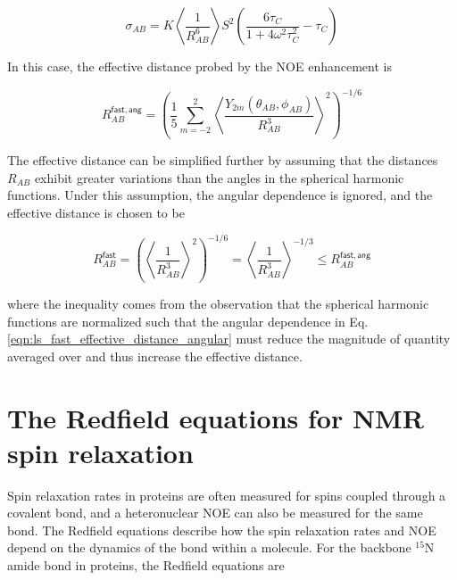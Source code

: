 \documentclass[9pt,review]{livecoms}
\begin{document}
\begin{equation}
\label{eqn:ls_fast_cross_relaxation}
\sigma_{AB} = K \left \langle \frac {1} {R_{AB}^6} \right \rangle S^2 \left( \frac {6 \tau_C} {1 + 4 \omega^2 \tau_C^2} - \tau_C \right)
\end{equation}

\noindent In this case, the effective distance probed by the NOE enhancement is

\begin{equation}
\label{eqn:ls_fast_effective_distance_angular}
R_{AB}^{\mathsf{fast,ang}} = \left( \frac {1} {5} \sum_{m=-2}^2 \left \langle \frac {Y_{2m}(\theta_{AB}, \phi_{AB})} {R_{AB}^3} \right \rangle^2 \right)^{-1/6}
\end{equation}

\noindent The effective distance can be simplified further by assuming that the distances $R_{AB}$ exhibit greater variations than the angles in the spherical harmonic functions.
Under this assumption, the angular dependence is ignored, and the effective distance is chosen to be

\begin{equation}
\label{eqn:ls_fast_effective_distance}
R_{AB}^{\mathsf{fast}} = \left( \left \langle \frac {1} {R_{AB}^3} \right \rangle^2 \right)^{-1/6} = \left \langle \frac {1} {R_{AB}^3} \right \rangle^{-1/3} \leq R_{AB}^{\mathsf{fast,ang}}
\end{equation}

\noindent where the inequality comes from the observation that the spherical harmonic functions are normalized such that the angular dependence in Eq. \ref{eqn:ls_fast_effective_distance_angular} must reduce the magnitude of quantity averaged over and thus increase the effective distance.

\section{The Redfield equations for NMR spin relaxation}
\label{app:spin_relax_redfield}

Spin relaxation rates in proteins are often measured for spins coupled through a covalent bond, and a heteronuclear NOE can also be measured for the same bond.
The Redfield equations \cite{redfield_theory_1965} describe how the spin relaxation rates and NOE depend on the dynamics of the bond within a molecule.
For the backbone $^{15}$N amide bond in proteins, the Redfield equations are
\end{document}
